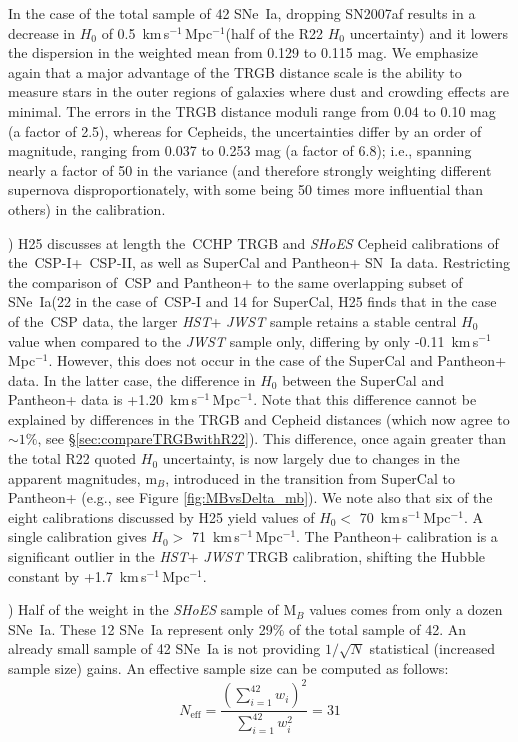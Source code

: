 \documentclass[12pt,modern]{aastex631}
\newcommand{\cchp}{\,CCHP\xspace}
\newcommand{\csp}{\,CSP\xspace}
\newcommand{\cspi}{\,CSP-I\xspace}
\newcommand{\cspii}{\,CSP-II\xspace}
\newcommand{\ho}{$H_{0}$\xspace}
\newcommand{\hounits}{\,km\,s$^{-1}$\,Mpc$^{-1}$\xspace}
\newcommand{\hst}{\emph{HST}\xspace}
\newcommand{\jwst}{\emph{JWST}\xspace}
\newcommand{\sne}{SNe~Ia\xspace}
\newcommand{\sn}{SN~Ia\xspace}
\newcommand{\shoes}{\emph{SHoES}\xspace}
\begin{document}
In the case of the total sample of 42 \sne, dropping SN2007af  results in a decrease in \ho of 0.5 \hounits (half of the R22 \ho uncertainty) and it lowers the dispersion in the weighted mean from 0.129 to 0.115 mag. We emphasize again that a major advantage of the TRGB distance scale is the ability to  measure stars in the outer regions of galaxies where  dust and crowding effects are minimal. The errors in the TRGB distance moduli range from 0.04 to 0.10 mag (a factor of 2.5), whereas for Cepheids, the uncertainties differ by an order of magnitude, ranging from 0.037 to 0.253 mag (a factor of 6.8); i.e., spanning nearly a factor of 50 in the variance (and therefore strongly weighting different supernova disproportionately,  with some being 50 times more influential than others) in the calibration. 


) H25 discusses at length the \cchp TRGB and \shoes Cepheid calibrations of the \cspi + \cspii, as well as SuperCal \citep{scolnic_2015} and Pantheon+ \citep{scolnic_2023} \sn data. Restricting the comparison of \csp and Pantheon+ to the same overlapping subset of \sne (22 in the case of \cspi and 14 for SuperCal, H25 finds that in the case of the \csp data, the larger \hst + \jwst sample retains a stable central \ho value when compared to the \jwst sample only, differing by only -0.11 \hounits. However, this does not occur in the case of the SuperCal and Pantheon+ data.  In the latter case, the difference in \ho between the SuperCal and Pantheon+ data is +1.20 \hounits. Note that this difference cannot be explained by differences in the TRGB and Cepheid distances (which now agree to $\sim1\%$, see \S \ref{sec:compareTRGBwithR22}). This difference, once again greater than the total R22 quoted \ho uncertainty, is now largely due to changes in the apparent magnitudes, m$_B$, introduced in the transition from SuperCal to Pantheon+ (e.g., see Figure \ref{fig:MBvsDelta_mb}). We note also that six of the eight calibrations discussed by H25 yield values of \ho $<$ 70 \hounits. A single calibration gives \ho $>$ 71 \hounits. The Pantheon+ calibration is a significant outlier in the \hst + \jwst TRGB calibration, shifting the Hubble constant by +1.7 \hounits.  




) Half of the weight in the \shoes sample of M$_B$ values comes from only a dozen \sne. These 12 \sne represent only 29\% of the total sample of 42. An already small sample of 42 \sne is not providing $1/\sqrt{N}$ statistical (increased sample size) gains. An effective sample size can be computed as follows: 
\begin{equation}
N_{\text{eff}} = \frac{(\sum_{i=1}^{42} w_i)^2}{\sum_{i=1}^{42} w_i^2} = 31
\label{eq:neff}
\end{equation}
\end{document}
